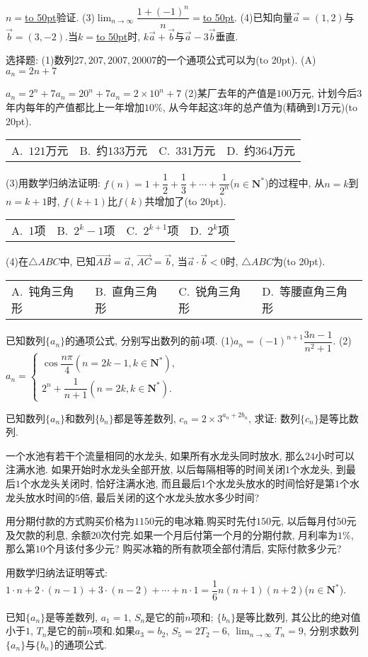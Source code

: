 \documentclass[10pt,a4paper]{article}
\newcommand{\blank}[1]{\underline{\hbox to #1pt{}}}
\newcommand{\bracket}[1]{(\hbox to #1pt{})}
\newcommand{\fourch}[4]{\par\begin{tabular}{p{.23\textwidth}p{.23\textwidth}p{.23\textwidth}p{.23\textwidth}}
A.~#1 &B.~#2& C.~#3& D.~#4
\end{tabular}}
\begin{document}
\begin{enumerate}[1.]
{$n=$\blank{50}验证.
(3)$\displaystyle\lim_{n\to\infty}\dfrac{1+(-1)^n}n=$\blank{50}.
(4)已知向量$\overrightarrow a=(1,2)$与$\overrightarrow b=(3,-2)$.当$k=$\blank{50}时, $k\overrightarrow a+\overrightarrow b$与$\overrightarrow a-3\overrightarrow b$垂直.
\item 选择题:
(1)数列$27, 207, 2 007, 20 007$的一个通项公式可以为\bracket{20}.
(A)$a_n=2n+7$}{$a_n=2^n+7$}{$a_n=20^n+7$}{$a_n=2\times 10^n+7$}
(2)某厂去年的产值是$100$万元, 计划今后$3$年内每年的产值都比上一年增加$10\%$, 从今年起这$3$年的总产值为(精确到$1$万元)\bracket{20}.
\fourch{$121$万元}{约$133$万元}{$331$万元}{约$364$万元}
(3)用数学归纳法证明: $f(n)=1+\dfrac 12+\dfrac 13+\cdots +\dfrac 1{2^n}$($n\in \mathbf{N}^*$)的过程中, 从$n=k$到$n=k+1$时, $f(k+1)$比$f(k)$共增加了\bracket{20}.
\fourch{1项}{$2^k-1$项}{$2^{k+1}$项}{$2^k$项}
(4)在$\triangle ABC$中, 已知$\overrightarrow{AB}=\overrightarrow a$, $\overrightarrow{AC}=\overrightarrow b$, 当$\overrightarrow a\cdot \overrightarrow b<0$时, $\triangle ABC$为\bracket{20}.
\fourch{钝角三角形}{直角三角形}{锐角三角形}{等腰直角三角形}
\item 已知数列$\{a_n\}$的通项公式, 分别写出数列的前$4$项.
(1)$a_n=(-1)^{n+1}\dfrac{3n-1}{n^2+1}$.
(2)$a_n=\begin{cases}
    \cos \dfrac{n\pi }4 (n=2k-1,k\in \mathbf{N}^*),  \\2^n+\dfrac 1{n+1} (n=2k,k\in \mathbf{N}^*).  \end{cases}$
\item 已知数列$\{a_n\}$和数列$\{b_n\}$都是等差数列, $c_n=2\times 3^{a_n+2b_n}$, 求证: 数列$\{c_n\}$是等比数列.
\item 一个水池有若干个流量相同的水龙头, 如果所有水龙头同时放水, 那么$24$小时可以注满水池. 如果开始时水龙头全部开放, 以后每隔相等的时间关闭$1$个水龙头, 到最后$1$个水龙头关闭时, 恰好注满水池, 而且最后$1$个水龙头放水的时间恰好是第$1$个水龙头放水时间的$5$倍, 最后关闭的这个水龙头放水多少时间?
\item 用分期付款的方式购买价格为$1150$元的电冰箱.购买时先付$150$元, 以后每月付$50$元及欠款的利息, 余额$20$次付完.如果一个月后付第一个月的分期付款, 月利率为$1\%$, 那么第$10$个月该付多少元? 购买冰箱的所有款项全部付清后, 实际付款多少元?
\item 用数学归纳法证明等式:
$1\cdot n+2\cdot (n-1)+3\cdot (n-2)+\cdots +n\cdot 1=\dfrac 16n(n+1)(n+2)$($n\in \mathbf{N}^*$).
\item 已知$\{a_n\}$是等差数列, $a_1=1$, $S_n$是它的前$n$项和; $\{b_n\}$是等比数列, 其公比的绝对值小于$1$, $T_n$是它的前$n$项和.如果$a_3=b_2$, $S_5=2T_2-6$, $\displaystyle\lim_{n\to\infty}T_n=9$, 分别求数列$\{a_n\}$与$\{b_n\}$的通项公式.

\end{enumerate}
\end{document}

